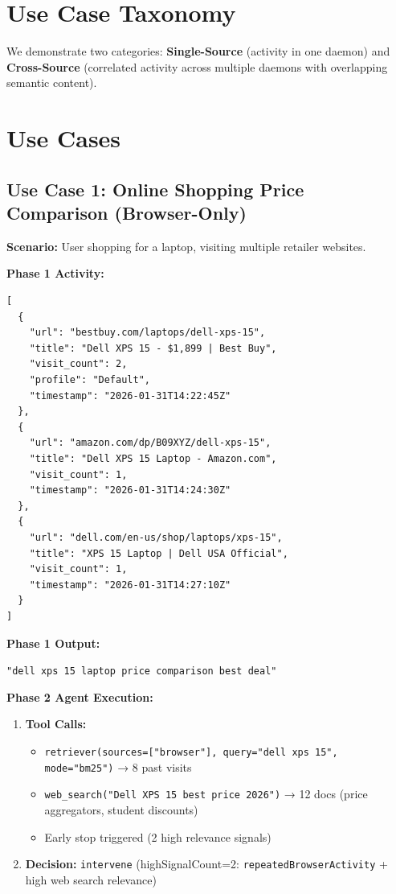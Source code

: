 \documentclass[11pt,a4paper]{article}
\begin{document}
\section{Use Case Taxonomy}

We demonstrate two categories: \textbf{Single-Source} (activity in one daemon) and \textbf{Cross-Source} (correlated activity across multiple daemons with overlapping semantic content).

\section{Use Cases}

\subsection{Use Case 1: Online Shopping Price Comparison (Browser-Only)}

\textbf{Scenario:} User shopping for a laptop, visiting multiple retailer websites.

\textbf{Phase 1 Activity:}
\begin{tcolorbox}[colback=gray!5,colframe=gray!80,title=Browser Logs (3 visits in 5 minutes)]
\begin{verbatim}
[
  {
    "url": "bestbuy.com/laptops/dell-xps-15",
    "title": "Dell XPS 15 - $1,899 | Best Buy",
    "visit_count": 2,
    "profile": "Default",
    "timestamp": "2026-01-31T14:22:45Z"
  },
  {
    "url": "amazon.com/dp/B09XYZ/dell-xps-15",
    "title": "Dell XPS 15 Laptop - Amazon.com",
    "visit_count": 1,
    "timestamp": "2026-01-31T14:24:30Z"
  },
  {
    "url": "dell.com/en-us/shop/laptops/xps-15",
    "title": "XPS 15 Laptop | Dell USA Official",
    "visit_count": 1,
    "timestamp": "2026-01-31T14:27:10Z"
  }
]
\end{verbatim}
\end{tcolorbox}

\textbf{Phase 1 Output:}
\begin{tcolorbox}[colback=blue!5,colframe=blue!80]
\texttt{"dell xps 15 laptop price comparison best deal"}
\end{tcolorbox}

\textbf{Phase 2 Agent Execution:}
\begin{enumerate}[leftmargin=*]
    \item \textbf{Tool Calls:}
    \begin{itemize}
        \item \texttt{retriever(sources=["browser"], query="dell xps 15", mode="bm25")} → 8 past visits
        \item \texttt{web\_search("Dell XPS 15 best price 2026")} → 12 docs (price aggregators, student discounts)
        \item Early stop triggered (2 high relevance signals)
    \end{itemize}
    \item \textbf{Decision:} \texttt{intervene} (highSignalCount=2: \texttt{repeatedBrowserActivity} + high web search relevance)
\end{enumerate}
\end{document}
